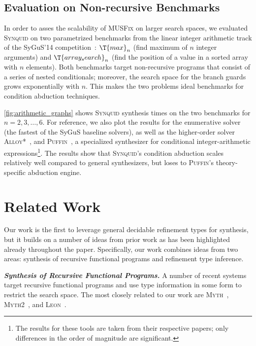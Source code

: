 \documentclass[10pt,preprint]{sigplanconf-pldi16}
\theoremstyle{definition}
\newcommand{\custompar}[1]{\parskip 0pt \textbf{\textit{#1}}}
\newcommand{\tool}{\textsc{Synquid}\xspace}
\begin{document}
\subsection{Evaluation on Non-recursive Benchmarks}

In order to asses the scalability of \textsc{MUSFix} on larger search spaces, 
we evaluated \tool on two parametrized benchmarks from the linear integer arithmetic track of the SyGuS'14 competition~\cite{AlurBJMRSSSTU13}: 
$\T{max}_n$ (find maximum of $n$ integer arguments)
and $\T{array_search}_n$ (find the position of a value in a sorted array with $n$ elements).
Both benchmarks target non-recursive programs that consist of a series of nested conditionals;
moreover, the search space for the branch guards grows exponentially with $n$.
This makes the two problems ideal benchmarks for condition abduction techniques.

\autoref{fig:arithmetic_graphs} shows \tool synthesis times on the two benchmarks for $n = 2,3,\ldots,6$.
For reference, we also plot the results for the enumerative solver (the fastest of the SyGuS baseline solvers),
as well as the higher-order solver \textsc{Alloy*}~\cite{MilicevicNKJ15},
and \textsc{Puffin}~\cite{AlurCR15}, a specialized synthesizer for conditional integer-arithmetic expressions\footnote{The results for these tools are taken from their respective papers;
only differences in the order of magnitude are significant.}.
The results show that \tool's condition abduction scales relatively well compared to general synthesizers,
but loses to \textsc{Puffin}'s theory-specific abduction engine.


\section{Related Work}\label{sec:related}

Our work is the first to leverage general decidable refinement types for synthesis, but it builds on a number of ideas
from prior work as has been highlighted already throughout the paper. Specifically, our work combines ideas from 
two areas: synthesis of recursive functional programs and refinement type inference.

\custompar{Synthesis of Recursive Functional Programs.}
A number of recent systems target recursive functional programs and use type information in some form to restrict the search space. 
The most closely related to our work are \textsc{Myth}~\cite{OseraZd15}, \textsc{Myth2}~\cite{FrankleOWZ16}, and \textsc{Leon}~\cite{KneussKuKuSu13}.
\end{document}
